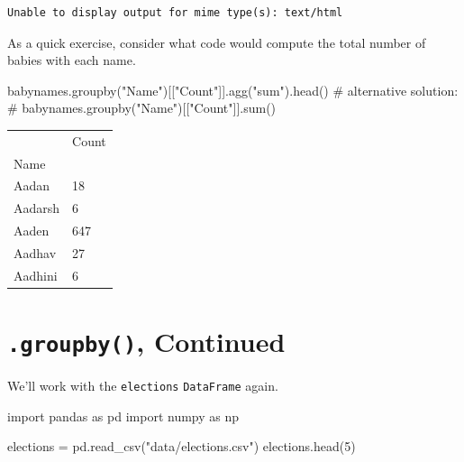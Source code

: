 \documentclass[
  letterpaper,
  DIV=11,
  numbers=noendperiod]{scrreprt}
\newenvironment{Shaded}{\begin{snugshade}}{\end{snugshade}}
\newcommand{\CommentTok}[1]{\textcolor[rgb]{0.37,0.37,0.37}{#1}}
\newcommand{\DecValTok}[1]{\textcolor[rgb]{0.68,0.00,0.00}{#1}}
\newcommand{\ImportTok}[1]{\textcolor[rgb]{0.00,0.46,0.62}{#1}}
\newcommand{\NormalTok}[1]{\textcolor[rgb]{0.00,0.23,0.31}{#1}}
\newcommand{\OperatorTok}[1]{\textcolor[rgb]{0.37,0.37,0.37}{#1}}
\newcommand{\StringTok}[1]{\textcolor[rgb]{0.13,0.47,0.30}{#1}}
\begin{document}
\begin{verbatim}
Unable to display output for mime type(s): text/html
\end{verbatim}

As a quick exercise, consider what code would compute the total number
of babies with each name.

\begin{Shaded}
\begin{Highlighting}[]
\NormalTok{babynames.groupby(}\StringTok{"Name"}\NormalTok{)[[}\StringTok{"Count"}\NormalTok{]].agg(}\StringTok{"sum"}\NormalTok{).head()}
\CommentTok{\# alternative solution: }
\CommentTok{\# babynames.groupby("Name")[["Count"]].sum()}
\end{Highlighting}
\end{Shaded}

\begin{longtable}[]{@{}ll@{}}
\toprule\noalign{}
& Count \\
Name & \\
\midrule\noalign{}
\endhead
\bottomrule\noalign{}
\endlastfoot
Aadan & 18 \\
Aadarsh & 6 \\
Aaden & 647 \\
Aadhav & 27 \\
Aadhini & 6 \\
\end{longtable}

\section{\texorpdfstring{\texttt{.groupby()},
Continued}{.groupby(), Continued}}\label{groupby-continued}

We'll work with the \texttt{elections} \texttt{DataFrame} again.

\begin{Shaded}
\begin{Highlighting}[]
\ImportTok{import}\NormalTok{ pandas }\ImportTok{as}\NormalTok{ pd}
\ImportTok{import}\NormalTok{ numpy }\ImportTok{as}\NormalTok{ np}

\NormalTok{elections }\OperatorTok{=}\NormalTok{ pd.read\_csv(}\StringTok{"data/elections.csv"}\NormalTok{)}
\NormalTok{elections.head(}\DecValTok{5}\NormalTok{)}
\end{Highlighting}
\end{Shaded}
\end{document}
